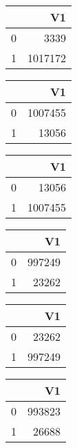 \bigskip\bigskip
\centering
\begin{tabular}{rr}
  \hline
 & V1 \\ 
  \hline
0 & 3339 \\ 
  1 & 1017172 \\ 
   \hline
\end{tabular}

\bigskip\bigskip
\centering
\begin{tabular}{rr}
  \hline
 & V1 \\ 
  \hline
0 & 1007455 \\ 
  1 & 13056 \\ 
   \hline
\end{tabular}

\bigskip\bigskip
\centering
\begin{tabular}{rr}
  \hline
 & V1 \\ 
  \hline
0 & 13056 \\ 
  1 & 1007455 \\ 
   \hline
\end{tabular}

\bigskip\bigskip
\centering
\begin{tabular}{rr}
  \hline
 & V1 \\ 
  \hline
0 & 997249 \\ 
  1 & 23262 \\ 
   \hline
\end{tabular}

\bigskip\bigskip
\centering
\begin{tabular}{rr}
  \hline
 & V1 \\ 
  \hline
0 & 23262 \\ 
  1 & 997249 \\ 
   \hline
\end{tabular}

\bigskip\bigskip
\centering
\begin{tabular}{rr}
  \hline
 & V1 \\ 
  \hline
0 & 993823 \\ 
  1 & 26688 \\ 
   \hline
\end{tabular}

